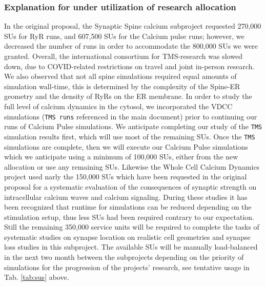 \documentclass[10pt, letterpaper]{article}
\begin{document}
\subsubsection*{Explanation for under utilization of research allocation}
In the original proposal, the Synaptic Spine calcium subproject requested 270,000 SUs for RyR runs, and 607,500 SUs for the Calcium pulse runs; however, we decreased the number of runs in order to accommodate the 800,000 SUs we were granted. Overall, the international consortium for TMS-research was slowed down, due to COVID-related restrictions on travel and joint in-person research.
We also observed that not all spine simulations required equal amounts of simulation wall-time, this is determined by the complexity of the Spine-ER geometry and the density of RyRs on the ER membrane. In order to study the full level of calcium dynamics in the cytosol, we incorporated the VDCC simulations (\texttt{TMS runs} referenced in the main document) prior to continuing our runs of Calcium Pulse simulations. We anticipate completing our study of the \texttt{TMS} simulation results first, which will use most of the remaining SUs. Once the \texttt{TMS} simulations are complete, then we will execute our Calcium Pulse simulations which we anticipate using a minimum of 100,000 SUs, either from the new allocation or use any remaining SUs. Likewise the Whole Cell Calcium Dynamics project used narly the 150,000 SUs which have been requested in the original proposal for a systematic evaluation of the consequences of synaptic strength on intracellular calcium waves and calcium signaling. During these studies it has been recognized that runtime for simulations can be reduced depending on the stimulation setup, thus less SUs had been required contrary to our expectation. Still the remaining 350,000 service units will be required to complete the tasks of systematic studies on synapse location on realistic cell geometries and synapse loss studies in this subproject. The available SUs will be manually load-balanced in the next two month between the subprojects depending on the priority of simulations for the progression of the projects' research, see tentative usage in Tab. \ref{tab:sus} above.


 
\end{document}
